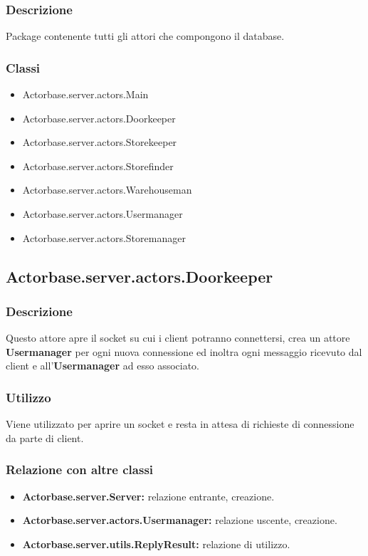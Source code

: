 \documentclass[a4paper]{article}
\begin{document}
			\subsubsection{Descrizione}
				Package contenente tutti gli attori che compongono il database.
				
			\subsubsection{Classi}
				\begin{itemize}
					\item Actorbase.server.actors.Main
					\item Actorbase.server.actors.Doorkeeper
					\item Actorbase.server.actors.Storekeeper
					\item Actorbase.server.actors.Storefinder
					\item Actorbase.server.actors.Warehouseman
					\item Actorbase.server.actors.Usermanager
					\item Actorbase.server.actors.Storemanager
				\end{itemize}
		
		\subsection{Actorbase.server.actors.Doorkeeper}
			\subsubsection{Descrizione}
				Questo attore apre il socket su cui i client potranno connettersi, crea un attore \textbf{Usermanager} per ogni nuova 
				connessione ed inoltra ogni messaggio ricevuto dal client e  all'\textbf{Usermanager} ad esso associato.
				
			\subsubsection{Utilizzo}
				Viene utilizzato per aprire un socket e resta in attesa di richieste di connessione da parte di client.
				
			\subsubsection{Relazione con altre classi}
				\begin{itemize}
					\item \textbf{Actorbase.server.Server:} relazione entrante, creazione.
					\item \textbf{Actorbase.server.actors.Usermanager:} relazione uscente, creazione.
					\item \textbf{Actorbase.server.utils.ReplyResult:} relazione di utilizzo.
				\end{itemize}
				
\end{document}
